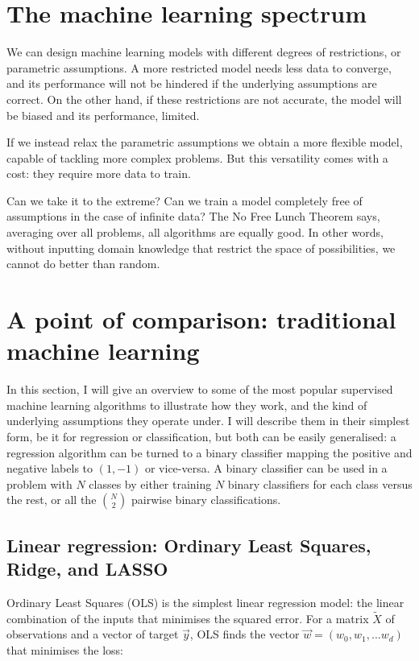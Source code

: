 \section{The machine learning spectrum}
We can design machine learning models with different degrees of restrictions, or parametric assumptions.
A more restricted model needs less data to converge, and its performance will not be hindered if the underlying assumptions are correct.
On the other hand, if these restrictions are not accurate, the model will be biased and its performance, limited.

If we instead relax the parametric assumptions we obtain a more flexible model, capable of tackling more complex problems.
But this versatility comes with a cost: they require more data to train.

\begin{center}
\end{center}

Can we take it to the extreme?
Can we train a model completely free  of assumptions in the case of infinite data? The No Free Lunch Theorem \citep{no_free_lunch} says, averaging over all problems, all algorithms are equally good.
In other words, without inputting domain knowledge that restrict the space of possibilities, we cannot do better than random. 

\section[Traditional machine learning]{A point of comparison: traditional machine learning}
In this section, I will give an overview to some of the most popular supervised machine learning algorithms to illustrate how they work, and the kind of underlying assumptions they operate under.
I will describe them in their simplest form, be it for regression or classification, but both can be easily generalised: a regression algorithm can be turned to a binary classifier mapping the positive and negative labels to $(1, -1)$ or vice-versa.
A binary classifier can be used in a problem with $N$ classes by either training $N$ binary classifiers for each class versus the rest, or all the $\binom{N}{2}$ pairwise binary classifications.

\subsection[Linear regression]{Linear regression: Ordinary Least Squares, Ridge, and LASSO}\label{sec:linear}
Ordinary Least Squares (OLS) is the simplest linear regression model: the linear combination of the inputs that minimises the squared error.
For a matrix $ \widetilde X$ of observations and a vector of target $\vec y$, OLS finds the vector $\vec w = (w_0, w_1, ... w_d)$ that minimises the loss:

